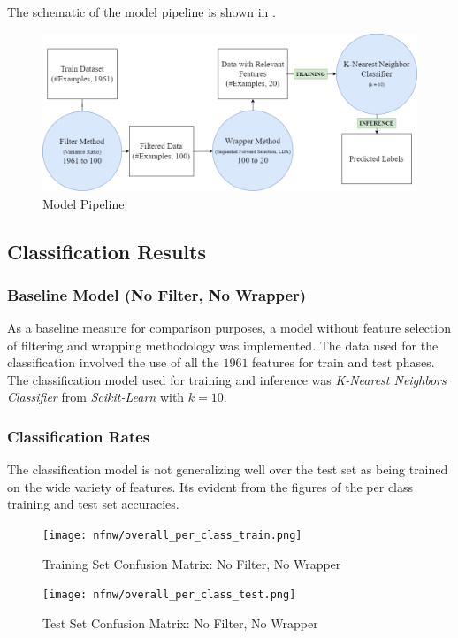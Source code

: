 \documentclass[12pt,twoside,a4paper]{article}
\begin{document}
The schematic of the model pipeline is shown in .

\begin{figure}[H]
    \centering
    \includegraphics[width=0.7\linewidth]{pipeline.png}
    \caption{Model Pipeline}
    \label{fig: NFW1}
\end{figure}

\pagebreak
\subsection{Classification Results}

\subsubsection{Baseline Model (No Filter, No Wrapper)}
As a baseline measure for comparison purposes, a model without feature selection of filtering and wrapping methodology was implemented. The data used for the classification involved the use of all the $1961$ features for train and test phases. The classification model used for training and inference was \textit{K-Nearest Neighbors Classifier} from \textit{Scikit-Learn} with $k=10$.

\subsubsection*{Classification Rates}
The classification model is not generalizing well over the test set as being trained on the wide variety of features. Its evident from the figures of the per class training and test set accuracies.
\begin{figure}[H]
    \centering
    \texttt{[image: nfnw/overall\_per\_class\_train.png]}
    \caption{Training Set Confusion Matrix: No Filter, No Wrapper}
    \label{fig: NFW1}
\end{figure}

\begin{figure}[H]
    \centering
    \texttt{[image: nfnw/overall\_per\_class\_test.png]}
    \caption{Test Set Confusion Matrix: No Filter, No Wrapper}
    \label{fig: NFW2}
\end{figure}
\end{document}
